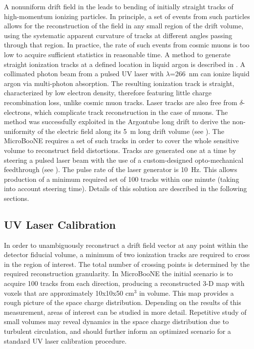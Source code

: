 A nonuniform drift field in the \lartpc leads to bending of initially straight tracks of high-momentum ionizing particles. In principle, a set of events from such particles allows for the reconstruction of the field in any small region of the \lartpc drift volume, using the systematic apparent curvature of tracks at different angles passing through that region. In practice, the rate of such events from cosmic muons is too low to acquire sufficient statistics in reasonable time. A method to generate straight ionization tracks at a defined location in liquid argon is described in \cite{Badhrees:2010}. A collimated photon beam from a pulsed UV laser with $\lambda$=266~nm can ionize liquid argon via multi-photon absorption. The resulting ionization track is straight, characterized by low electron density, therefore featuring little charge recombination loss, unlike cosmic muon tracks. Laser tracks are also free from $\delta$-electrons, which complicate track reconstruction in the case of muons. The method was successfully exploited in the Argontube long drift \lartpc \cite{Badhrees:2012-argontube,Ereditato:2013-argontube,Zeller:2013-argontube} to derive the non-uniformity of the electric field along its 5~m long drift volume (see \cite{Ereditato:2014-argontubedrift}). The MicroBooNE \lartpc requires a set of such tracks in order to cover the whole sensitive volume to reconstruct field distortions. Tracks are generated one at a time by steering a pulsed laser beam with the use of a custom-designed opto-mechanical feedthrough (see \cite{Ereditato:2014-laser}). The pulse rate of the laser generator is 10~Hz. This allows production of a minimum required set of 100 tracks within one minute (taking into account steering time). Details of this solution are described in the following sections.

\subsection{UV Laser Calibration}
In order to unambiguously reconstruct a drift field vector at any point within the detector fiducial volume, a minimum of two ionization tracks are required to cross in the region of interest. The total number of crossing points is determined by the required reconstruction granularity. In MicroBooNE the initial scenario is to acquire 100 tracks from each direction, producing a reconstructed 3-D map with voxels that are approximately 10x10x50 cm$^3$ in volume. This map provides a rough picture of the space charge distribution. Depending on the results of this measurement, areas of interest can be studied in more detail. Repetitive study of small volumes may reveal dynamics in the space charge distribution due to turbulent circulation, and should further inform an optimized scenario for a standard UV laser calibration procedure.  

